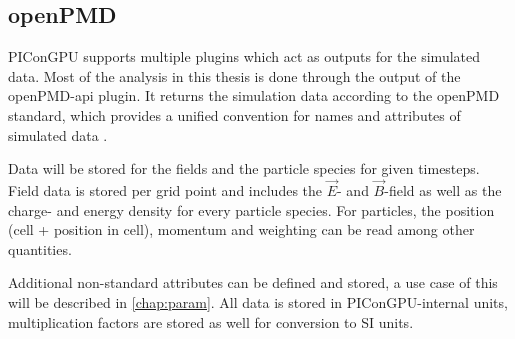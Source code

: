 \documentclass[bachelor_thesis]{subfiles}
\begin{document}
\subsection{openPMD}
PIConGPU supports multiple plugins which act as outputs for the simulated data. Most of the analysis in this thesis is done through the output of the openPMD-api \cite{openPMDAPI} plugin.
It returns the simulation data according to the openPMD standard, which provides a unified convention for names and attributes of simulated data \cite{openPMDstandard}.

Data will be stored for the fields and the particle species for given timesteps. Field data is stored per grid point and includes the $\vec{E}$- and $\vec{B}$-field as well as the charge- and energy density for every particle species.
For particles, the position (cell + position in cell), momentum and weighting can be read among other quantities. 

Additional non-standard attributes can be defined and stored, a use case of this will be described in \autoref{chap:param}. All data is stored in PIConGPU-internal units, multiplication factors are stored as well for conversion to SI units.
\end{document}
